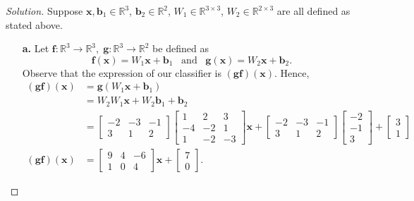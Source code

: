 \documentclass[ 12pt ]{article}
\begin{document}
\begin{enumerate}
		\begin{proof}[Solution]
			Suppose $\textbf{x}, \textbf{b}_1 \in \mathbb{R}^3$, $\textbf{b}_2 \in \mathbb{R}^2$, $W_1 \in \mathbb{R}^{3 \times 3}$, $W_2 \in \mathbb{R}^{2 \times 3}$ are all defined as
			stated above.
			\begin{enumerate}
				\item[\textbf{a.}] Let $\textbf{f} : \mathbb{R}^3 \to \mathbb{R}^3,\; \textbf{g} : \mathbb{R}^3 \to \mathbb{R}^2$ be defined as $$\textbf{f}(\textbf{x}) = W_1 \textbf{x}
					+ \textbf{b}_1\;\;\; \mathrm{and}\;\;\; \textbf{g}(\textbf{x}) = W_2 \textbf{x} + \textbf{b}_2.$$ Observe that the expression of our classifier is $(\textbf{gf})(
					\textbf{x})$. Hence,
					\begin{align*}
						(\textbf{gf})(\textbf{x}) &= \textbf{g}(W_1 \textbf{x} + \textbf{b}_1) \\
						&= W_2 W_1 \textbf{x} + W_2 \textbf{b}_1 + \textbf{b}_2 \\
						&= \begin{bmatrix} -2 & -3 & -1 \\ 3 & 1 & 2 \end{bmatrix} \begin{bmatrix} 1 & 2 & 3 \\ -4 & -2 & 1 \\ 1 & -2 & -3 \end{bmatrix} \textbf{x} +
							\begin{bmatrix} -2 & -3 & -1 \\ 3 & 1 & 2 \end{bmatrix} \begin{bmatrix} -2 \\ -1 \\ 3 \end{bmatrix} + \begin{bmatrix} 3 \\ 1 \end{bmatrix} \\
						(\textbf{gf})(\textbf{x}) &= \begin{bmatrix} 9 & 4 & -6 \\ 1 & 0 & 4 \end{bmatrix} \textbf{x} + \begin{bmatrix} 7 \\ 0 \end{bmatrix}.
					\end{align*}


\end{enumerate}
\end{proof}
\end{enumerate}
\end{document}
